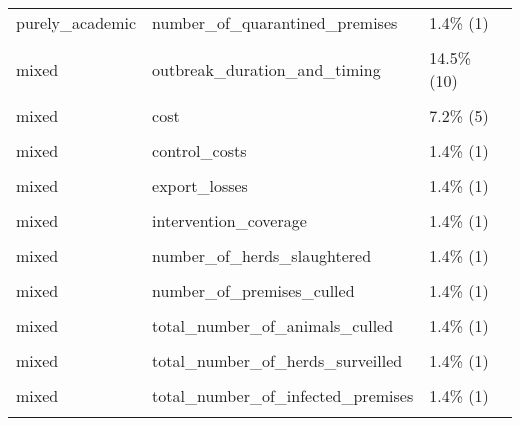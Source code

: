 \documentclass[
]{article}
\begin{document}
\begin{longtable}[t]{lll}
\addlinespace
purely\_academic & number\_of\_quarantined\_premises & 1.4\%  (1)\\
\cellcolor{gray!6}{purely\_academic} & \cellcolor{gray!6}{the\_number\_of\_pre-emptively\_slaughtered\_farms} & \cellcolor{gray!6}{1.4\%  (1)}\\
mixed & outbreak\_duration\_and\_timing & 14.5\% (10)\\
\cellcolor{gray!6}{mixed} & \cellcolor{gray!6}{final\_epidemic\_size} & \cellcolor{gray!6}{13.0\%  (9)}\\
mixed & cost & 7.2\%  (5)\\
\addlinespace
\cellcolor{gray!6}{mixed} & \cellcolor{gray!6}{compensation} & \cellcolor{gray!6}{1.4\%  (1)}\\
mixed & control\_costs & 1.4\%  (1)\\
\cellcolor{gray!6}{mixed} & \cellcolor{gray!6}{employment\_effects} & \cellcolor{gray!6}{1.4\%  (1)}\\
mixed & export\_losses & 1.4\%  (1)\\
\cellcolor{gray!6}{mixed} & \cellcolor{gray!6}{income\_effects} & \cellcolor{gray!6}{1.4\%  (1)}\\
\addlinespace
mixed & intervention\_coverage & 1.4\%  (1)\\
\cellcolor{gray!6}{mixed} & \cellcolor{gray!6}{number\_of\_animals\_culled} & \cellcolor{gray!6}{1.4\%  (1)}\\
mixed & number\_of\_herds\_slaughtered & 1.4\%  (1)\\
\cellcolor{gray!6}{mixed} & \cellcolor{gray!6}{number\_of\_herds\_vaccinated} & \cellcolor{gray!6}{1.4\%  (1)}\\
mixed & number\_of\_premises\_culled & 1.4\%  (1)\\
\addlinespace
\cellcolor{gray!6}{mixed} & \cellcolor{gray!6}{output\_effects} & \cellcolor{gray!6}{1.4\%  (1)}\\
mixed & total\_number\_of\_animals\_culled & 1.4\%  (1)\\
\cellcolor{gray!6}{mixed} & \cellcolor{gray!6}{total\_number\_of\_herds\_culled} & \cellcolor{gray!6}{1.4\%  (1)}\\
mixed & total\_number\_of\_herds\_surveilled & 1.4\%  (1)\\
\cellcolor{gray!6}{mixed} & \cellcolor{gray!6}{total\_number\_of\_herds\_vaccinated} & \cellcolor{gray!6}{1.4\%  (1)}\\
\addlinespace
mixed & total\_number\_of\_infected\_premises & 1.4\%  (1)\\
\cellcolor{gray!6}{Total} & \cellcolor{gray!6}{-} & \cellcolor{gray!6}{100.0\% (69)}\\*
\end{longtable}
\end{document}
